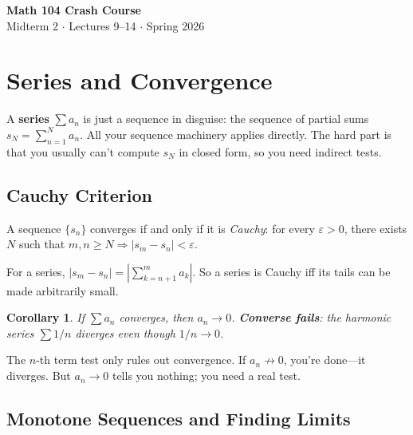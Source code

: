 \documentclass[11pt]{article}
\newcommand{\eps}{\varepsilon}
\theoremstyle{myplain}
\newtheorem{corollary}[theorem]{Corollary}
\theoremstyle{definition}
\theoremstyle{remark}
\begin{document}
\begin{center}
  {\LARGE\bfseries Math 104 Crash Course}\\[4pt]
  {\large Midterm 2 $\cdot$ Lectures 9--14 $\cdot$ Spring 2026}
\end{center}

\bigskip

\tableofcontents
\newpage

\section{Series and Convergence}

\begin{bigpicture}
A \textbf{series} $\sum a_n$ is just a sequence in disguise: the sequence of partial sums $s_N = \sum_{n=1}^N a_n$. All your sequence machinery applies directly. The hard part is that you usually can't compute $s_N$ in closed form, so you need indirect tests.
\end{bigpicture}

\subsection{Cauchy Criterion}

A sequence $\{s_n\}$ converges if and only if it is \emph{Cauchy}: for every $\eps > 0$, there exists $N$ such that $m, n \geq N \Rightarrow |s_m - s_n| < \eps$.

For a series, $|s_m - s_n| = \left|\sum_{k=n+1}^m a_k\right|$. So a series is Cauchy iff its tails can be made arbitrarily small.

\begin{corollary}
If $\sum a_n$ converges, then $a_n \to 0$. \textbf{Converse fails}: the harmonic series $\sum 1/n$ diverges even though $1/n \to 0$.
\end{corollary}

\begin{insight}
The $n$-th term test only rules out convergence. If $a_n \not\to 0$, you're done---it diverges. But $a_n \to 0$ tells you nothing; you need a real test.
\end{insight}

\subsection{Monotone Sequences and Finding Limits}
\end{document}
